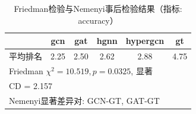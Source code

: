 \begin{table}[htbp]
\centering
\caption{Friedman检验与Nemenyi事后检验结果（指标: accuracy）}
\label{tab:friedman_accuracy}
\begin{tabular}{lccccc}
\toprule
 & gcn & gat & hgnn & hypergcn & gt \\
\midrule
平均排名 & 2.25 & 2.50 & 2.62 & 2.88 & 4.75 \\
\midrule
\multicolumn{6}{l}{Friedman $\chi^2 = 10.519, p = 0.0325$, 显著} \\
\multicolumn{6}{l}{CD = 2.157} \\
\multicolumn{6}{l}{Nemenyi显著差异对: GCN-GT, GAT-GT} \\
\bottomrule
\end{tabular}
\end{table}